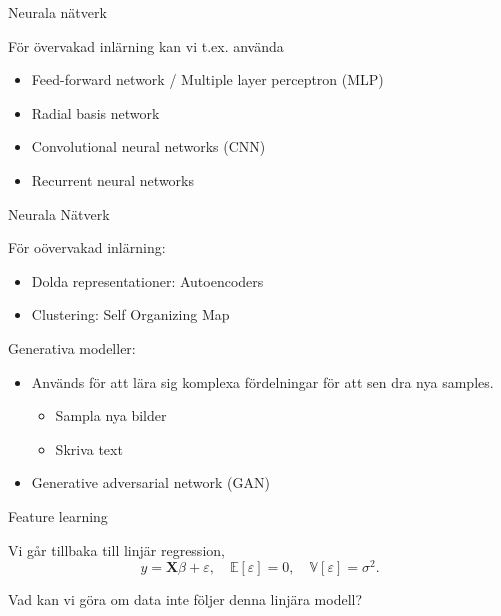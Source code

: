 \documentclass[10pt,english]{beamer}
\begin{document}
\begin{frame}{Neurala nätverk}
    
    För övervakad inlärning kan vi t.ex. använda
    \begin{itemize}
        \item Feed-forward network / Multiple layer perceptron (MLP)
        \item Radial basis network
        \item Convolutional neural networks (CNN)
        \item Recurrent neural networks
    \end{itemize}

\end{frame}


\begin{frame}{Neurala Nätverk}

    För oövervakad inlärning:
    \begin{itemize}
        \item Dolda representationer: Autoencoders
        \item Clustering: Self Organizing Map
    \end{itemize}

    Generativa modeller:
    \begin{itemize}
        \item Används för att lära sig komplexa fördelningar för att sen dra nya samples.
        \begin{itemize}
            \item Sampla nya bilder
            \item Skriva text
        \end{itemize}
        \item Generative adversarial network (GAN)
    \end{itemize}
    
\end{frame}

\begin{frame}{Feature learning}

    Vi går tillbaka till linjär regression,
    \begin{equation*}
        y = \mathbf{X} \beta + \varepsilon, \quad \mathbb{E}[\varepsilon] = 0, \quad \mathbb{V}[\varepsilon] = \sigma^2.
    \end{equation*}
    
    Vad kan vi göra om data inte följer denna linjära modell?

\end{frame}
\end{document}
